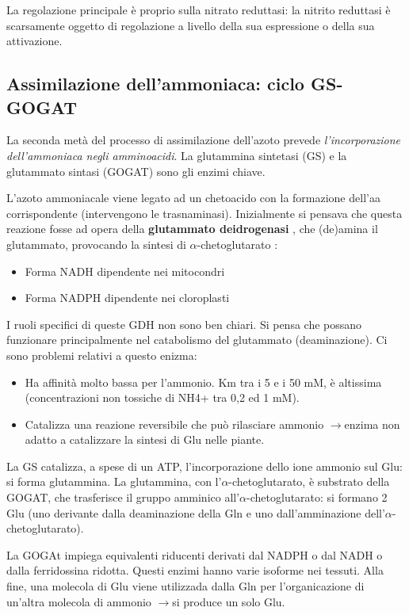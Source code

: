 \documentclass[a4paper,12pt]{book}
\newcommand{\lfreccia}{\ensuremath{\longrightarrow}}
\begin{document}
La regolazione principale è proprio sulla nitrato reduttasi: la nitrito reduttasi è scarsamente oggetto di regolazione a livello della sua espressione o della sua attivazione.

\subsection{Assimilazione dell'ammoniaca: ciclo GS-GOGAT}
La seconda metà del processo di assimilazione dell'azoto prevede \emph{l'incorporazione dell'ammoniaca negli amminoacidi}. La glutammina sintetasi (GS) e la glutammato sintasi (GOGAT) sono gli enzimi chiave.

L'azoto ammoniacale viene legato ad un chetoacido con la formazione dell'aa corrispondente (intervengono le trasnaminasi).
Inizialmente si pensava che questa reazione fosse ad opera della \textbf{glutammato deidrogenasi} , che (de)amina il glutammato, provocando la sintesi di $\alpha$-chetoglutarato :

\begin{itemize}
\item{Forma NADH dipendente nei mitocondri}
\item{Forma NADPH dipendente nei cloroplasti}
\end{itemize}

I ruoli specifici di queste GDH non sono ben chiari. Si pensa che possano funzionare principalmente
nel catabolismo del glutammato (deaminazione).
Ci sono problemi relativi a questo enizma:
\begin{itemize}
\item{Ha affinità molto bassa per l'ammonio. Km tra i 5 e i 50 mM, è altissima (concentrazioni non tossiche di NH4+ tra 0,2 ed 1 mM).}
\item{Catalizza una reazione reversibile che può rilasciare ammonio \lfreccia enzima non adatto a catalizzare la sintesi di Glu nelle piante.}
\end{itemize}

La GS catalizza, a spese di un ATP, l'incorporazione dello ione ammonio sul Glu: si forma glutammina. La glutammina, con l'$\alpha$-chetoglutarato, è substrato della GOGAT, che trasferisce il gruppo amminico all'$\alpha$-chetoglutarato: si formano 2 Glu (uno derivante dalla deaminazione della Gln e uno dall'amminazione dell'$\alpha$-chetoglutarato).

La GOGAt impiega equivalenti riducenti derivati dal NADPH o dal NADH o dalla ferridossina ridotta. Questi enzimi hanno varie isoforme nei tessuti.
Alla fine, una molecola di Glu viene utilizzada dalla Gln per l'organicazione di un'altra molecola di ammonio \lfreccia si produce un solo Glu.
\end{document}
